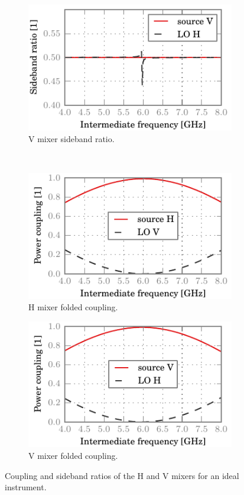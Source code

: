 \begin{figure}[hbtp]
    \begin{subfigure}[b]{.5\textwidth}
        \includegraphics{chapter_3/0_ideal_v_sbr}%
        \caption{V mixer sideband ratio.}
    \end{subfigure}%
    \\
    \begin{subfigure}[b]{.5\textwidth}
        \includegraphics{chapter_3/0_ideal_h_ssb}%
        \caption{H mixer folded coupling.}
    \end{subfigure}%
    \begin{subfigure}[b]{.5\textwidth}
        \includegraphics{chapter_3/0_ideal_v_ssb}%
        \caption{V mixer folded coupling.}
    \end{subfigure}%
    \caption{Coupling and sideband ratios of the H and V mixers for an ideal instrument.}
    \label{fig:0_ideal}
\end{figure}

